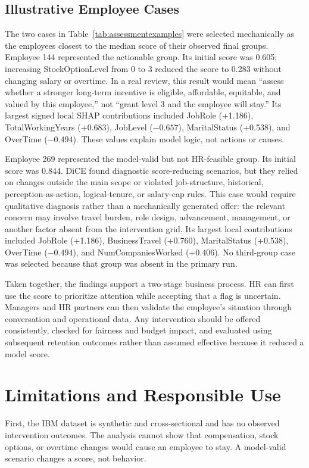 \documentclass[11pt]{article}
\begin{document}
\subsection{Illustrative Employee Cases}
The two cases in Table~\ref{tab:assessmentexamples} were selected mechanically as the employees closest to the median score of their observed final groups. Employee 144 represented the actionable group. Its initial score was 0.605; increasing StockOptionLevel from 0 to 3 reduced the score to 0.283 without changing salary or overtime. In a real review, this result would mean ``assess whether a stronger long-term incentive is eligible, affordable, equitable, and valued by this employee,'' not ``grant level 3 and the employee will stay.'' Its largest signed local SHAP contributions included JobRole (+1.186), TotalWorkingYears (+0.683), JobLevel ($-0.657$), MaritalStatus (+0.538), and OverTime ($-0.494$). These values explain model logic, not actions or causes.

Employee 269 represented the model-valid but not HR-feasible group. Its initial score was 0.844. DiCE found diagnostic score-reducing scenarios, but they relied on changes outside the main scope or violated job-structure, historical, perception-as-action, logical-tenure, or salary-cap rules. This case would require qualitative diagnosis rather than a mechanically generated offer: the relevant concern may involve travel burden, role design, advancement, management, or another factor absent from the intervention grid. Its largest local contributions included JobRole (+1.186), BusinessTravel (+0.760), MaritalStatus (+0.538), OverTime ($-0.494$), and NumCompaniesWorked (+0.406). No third-group case was selected because that group was absent in the primary run.

Taken together, the findings support a two-stage business process. HR can first use the score to prioritize attention while accepting that a flag is uncertain. Managers and HR partners can then validate the employee's situation through conversation and operational data. Any intervention should be offered consistently, checked for fairness and budget impact, and evaluated using subsequent retention outcomes rather than assumed effective because it reduced a model score.

\section{Limitations and Responsible Use}
First, the IBM dataset is synthetic and cross-sectional and has no observed intervention outcomes. The analysis cannot show that compensation, stock options, or overtime changes would cause an employee to stay. A model-valid scenario changes a score, not behavior.
\end{document}
